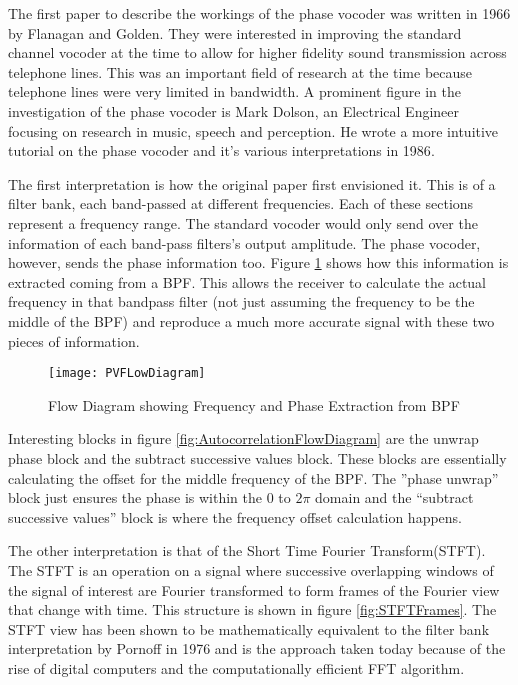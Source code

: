 The first paper to describe the workings of the phase vocoder was written in 1966
by Flanagan and Golden\cite{OriginalPhaseVocoder}. They were interested in
improving the standard channel vocoder at the time to allow for higher fidelity
sound transmission across telephone lines. This was an important field of research
at the time because telephone lines were very limited in bandwidth. A prominent
figure in the investigation of the phase vocoder is Mark Dolson, an Electrical
Engineer focusing on research in music, speech and perception. He wrote a more
intuitive tutorial on the phase vocoder and it's various interpretations in
1986\cite{DolsonTutorial}.

The first interpretation is how the original paper first envisioned it. This is of
a filter bank, each band-passed at different frequencies. Each of these sections
represent a frequency range. The standard vocoder would only send over the
information of each band-pass filters's output amplitude. The phase vocoder,
however, sends the phase information too. Figure \ref{fig:PVFLowDiagram} shows how
this information is extracted coming from a BPF. This allows the receiver to
calculate the actual frequency in that bandpass filter (not just assuming the
frequency to be the middle of the BPF) and reproduce a much more accurate signal
with these two pieces of information.

\begin{figure}[h]
	\texttt{[image: PVFLowDiagram]}
	\caption{Flow Diagram showing Frequency and Phase Extraction from
	BPF\cite{OriginalPhaseVocoder}}
	\label{fig:PVFLowDiagram}
\end{figure}

Interesting blocks in figure \ref{fig:AutocorrelationFlowDiagram} are the unwrap
phase block and the subtract successive values block. These blocks are essentially
calculating the offset for the middle frequency of the BPF. The ''phase unwrap''
block just ensures the phase is within the 0 to $2\pi$ domain and the ``subtract
successive values'' block is where the frequency offset calculation happens.

The other interpretation is that of the Short Time Fourier Transform(STFT). The
STFT is an operation on a signal where successive overlapping windows of the
signal of interest are Fourier transformed to form frames of the Fourier view that
change with time. This structure is shown in figure \ref{fig:STFTFrames}. The STFT
view has been shown to be mathematically equivalent to the filter bank
interpretation by Pornoff in 1976\cite{STFTPhaseVocoder} and is the approach taken
today because of the rise of digital computers and the computationally efficient
FFT algorithm.

